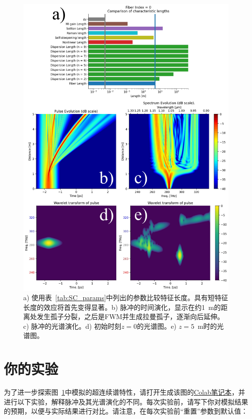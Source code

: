 \begin{figure}
    \centering
    \includegraphics[width=0.9\linewidth]{figures/SC_combined.png}
    \caption{a) 使用表~\ref{tab:SC_params}中列出的参数比较特征长度。具有短特征长度的效应将首先变得显著。b) 脉冲的时间演化，显示在约1~m的距离处发生孤子分裂，之后是FWM并生成拉曼孤子，逐渐向后延伸。c) 脉冲的光谱演化。d) 初始时刻$z=0$的光谱图。e) $z=5$~m时的光谱图。}
    \label{fig:SC_combined}
\end{figure}

\section{你的实验}
为了进一步探索图~\ref{fig:SC_combined}中模拟的超连续谱特性，请打开生成该图的\href{https://colab.research.google.com/drive/1HvA8F8yzEq-9fahuI4z2KhT-YhdRAXgt?usp=sharing}{Colab笔记本}，并进行以下实验，解释脉冲及其光谱演化的不同。每次实验前，请写下你对模拟结果的预期，以便与实际结果进行对比。请注意，在每次实验前“重置”参数到默认值：

